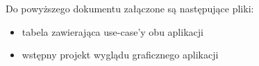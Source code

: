 Do powyższego dokumentu załączone są następujące pliki:
\begin{itemize}
    \item tabela zawierająca use-case'y obu aplikacji
    \item wstępny projekt wyglądu graficznego aplikacji
\end{itemize}

